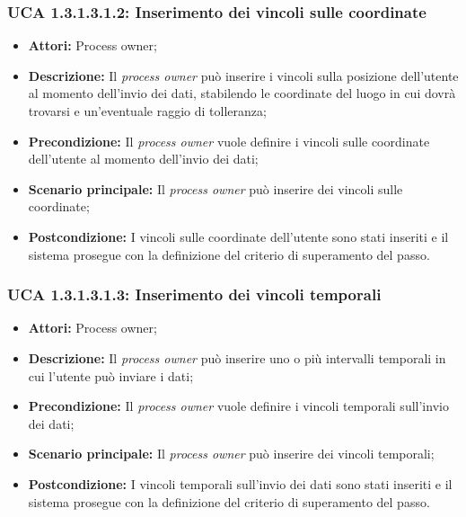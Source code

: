\hypertarget{A1.3.1.3.1.2}{}
\subsubsection{UCA 1.3.1.3.1.2: Inserimento dei vincoli sulle coordinate}
\begin{itemize}
\item \textbf{Attori:} Process owner;
\item \textbf{Descrizione:}
Il \textit{process owner} può inserire i vincoli sulla posizione dell'utente al momento dell'invio dei dati, stabilendo le coordinate del luogo in cui dovrà trovarsi e un'eventuale raggio di tolleranza;
\item \textbf{Precondizione:}
Il \textit{process owner} vuole definire i vincoli sulle coordinate dell'utente al momento dell'invio dei dati;
\item \textbf{Scenario principale:}
Il \textit{process owner} può inserire dei vincoli sulle coordinate;
\item \textbf{Postcondizione:}
I vincoli sulle coordinate dell'utente sono stati inseriti e il sistema prosegue con la definizione del criterio di superamento del passo.
\end{itemize}

\hypertarget{A1.3.1.3.1.3}{}
\subsubsection{UCA 1.3.1.3.1.3: Inserimento dei vincoli temporali}
\begin{itemize}
\item \textbf{Attori:} Process owner;
\item \textbf{Descrizione:}
Il \textit{process owner} può inserire uno o più intervalli temporali in cui l'utente può inviare i dati;
\item \textbf{Precondizione:}
Il \textit{process owner} vuole definire i vincoli temporali sull'invio dei dati;
\item \textbf{Scenario principale:}
Il \textit{process owner} può inserire dei vincoli temporali;
\item \textbf{Postcondizione:}
I vincoli temporali sull'invio dei dati sono stati inseriti e il sistema prosegue con la definizione del criterio di superamento del passo.
\end{itemize}

